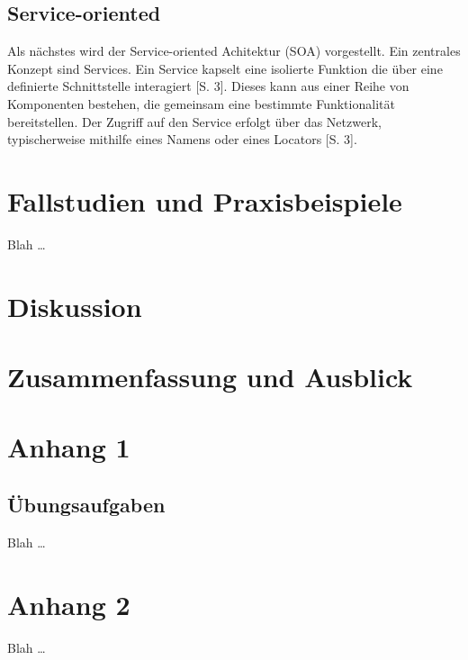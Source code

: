 \documentclass[acmtog]{acmart}
\begin{document}
\subsection{Service-oriented}

Als nächstes wird der Service-oriented Achitektur (SOA) vorgestellt. Ein 
zentrales Konzept sind Services. Ein Service kapselt eine isolierte 
Funktion die über eine definierte Schnittstelle interagiert \cite{soa}[S. 3].
Dieses kann aus einer Reihe von Komponenten bestehen, die gemeinsam eine 
bestimmte Funktionalität bereitstellen. Der Zugriff auf den Service erfolgt über
das Netzwerk, typischerweise mithilfe eines Namens oder eines Locators \cite{soa2}[S. 3].

\section{Fallstudien und Praxisbeispiele}
Blah \ldots \cite{dummy}

\section{Diskussion}

\section{Zusammenfassung und Ausblick}




\appendix

\section{Anhang 1}

\subsection{Übungsaufgaben}
Blah \ldots

\section{Anhang 2}
Blah \ldots
\end{document}
